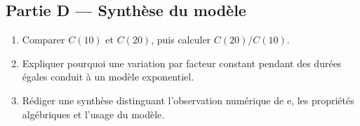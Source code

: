 \subsection*{Partie D — Synthèse du modèle}
\begin{enumerate}[resume]
\item Comparer $C(10)$ et $C(20)$, puis calculer $C(20)/C(10)$.
\item Expliquer pourquoi une variation par facteur constant pendant des durées égales conduit à un modèle exponentiel.
\item Rédiger une synthèse distinguant l'observation numérique de $\mathrm{e}$, les propriétés algébriques et l'usage du modèle.
\end{enumerate}


